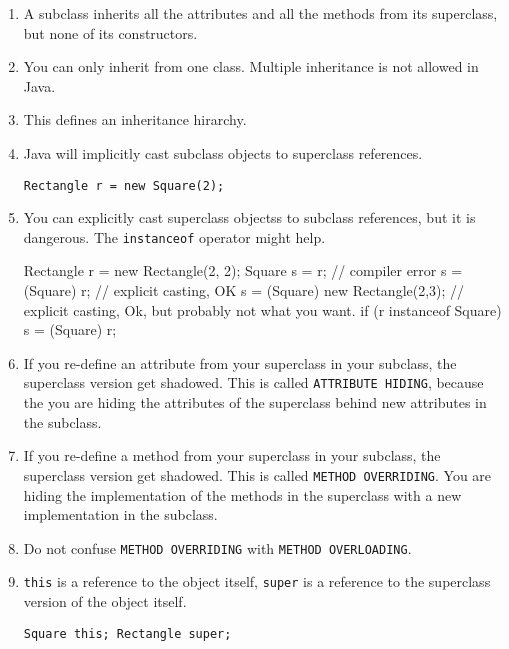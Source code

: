 \documentclass[a4paper, 9pt]{extarticle}
\begin{document}
\begin{enumerate}

  \item A subclass inherits all the attributes and all the methods from its
    superclass, but none of its constructors.

  \item You can only inherit from one class. Multiple inheritance is not
    allowed in Java.

  \item This defines an inheritance hirarchy.

  \item Java will implicitly cast subclass objects to superclass references.

    \verb+Rectangle r = new Square(2);+

  \item You can explicitly cast superclass objectss to subclass references, but
    it is dangerous. The \verb+instanceof+ operator might help.

\begin{blackboard}
Rectangle r = new Rectangle(2, 2);
Square s = r; // compiler error
s = (Square) r; // explicit casting, OK
s = (Square) new Rectangle(2,3); // explicit casting, Ok, but probably not what you want.
if (r instanceof Square) {
  s = (Square) r;
}
\end{blackboard}

  \item If you re-define an attribute from your superclass in your subclass,
    the superclass version get shadowed. This is called
    \verb+ATTRIBUTE HIDING+, because the you are hiding the attributes of the
    superclass behind new attributes in the subclass.

  \item If you re-define a method from your superclass in your subclass, the
    superclass version get shadowed. This is called \verb+METHOD OVERRIDING+.
    You are hiding the implementation of the methods in the superclass with a
    new implementation in the subclass.

  \item Do not confuse \verb+METHOD OVERRIDING+ with \verb+METHOD OVERLOADING+.

  \item \verb+this+ is a reference to the object itself, \verb+super+ is a
    reference to the superclass version of the object itself.

    \verb+Square this; Rectangle super;+


\end{enumerate}
\end{document}
